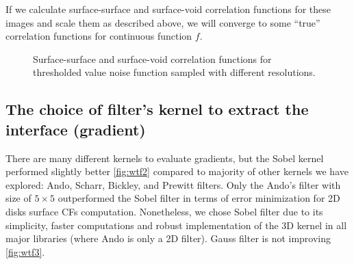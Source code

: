 \documentclass[reprint,amsmath,amssymb,aps,pre]{revtex4-1}
\begin{document}
If we calculate surface-surface and surface-void correlation functions for these
images and scale them as described above, we will converge to some ``true''
correlation functions for continuous function $f$.

\begin{figure}[ht]
  \centering
  \hfill
    \caption[]{Surface-surface and surface-void correlation functions for
      thresholded value noise function sampled with different resolutions.}
    \label{fig:scaling-noise}
\end{figure}

\subsection{The choice of filter’s kernel to extract the interface (gradient)}
There are many different kernels to evaluate gradients, but the Sobel kernel
performed slightly better \cref{fig:wtf2} compared to majority of other kernels
we have explored: Ando, Scharr, Bickley, and Prewitt filters. Only the Ando’s
filter with size of $5 \times 5$ \cite{ando_2000} outperformed the Sobel filter
in terms of error minimization for 2D disks surface CFs
computation. Nonetheless, we chose Sobel filter due to its simplicity, faster
computations and robust implementation of the 3D kernel in all major libraries
(where Ando is only a 2D filter). Gauss filter is not improving \cref{fig:wtf3}.
\end{document}
